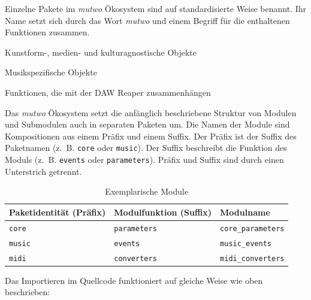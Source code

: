 \documentclass[12pt,a4paper,ngerman]{article}
\begin{document}
Einzelne Pakete im \emph{mutwo} Ökosystem sind auf standardisierte Weise benannt.
Ihr Name setzt sich durch das Wort \emph{mutwo} und einem Begriff für die enthaltenen Funktionen zusammen.

\bigskip

\hspace{0.5cm}
\begin{minipage}{0.95\textwidth}
    \begin{description}[style=multiline, leftmargin=3.25cm, font=\normalfont\emph]
        \item[mutwo.core] Kunstform-, medien- und kulturagnostische Objekte
        \item[mutwo.music] Musikspezifische Objekte
        \item[mutwo.reaper] Funktionen, die mit der DAW Reaper zusammenhängen
    \end{description}
\end{minipage}

\bigskip

Das \emph{mutwo} Ökosystem setzt die anfänglich beschriebene Struktur von Modulen und Submodulen auch in separaten Paketen um.
Die Namen der Module sind Kompositionen aus einem Präfix und einem Suffix.
Der Präfix ist der Suffix des Paketnamen (z.~B. \texttt{core} oder \texttt{music}).
Der Suffix beschreibt die Funktion des Moduls (z.~B. \texttt{events} oder \texttt{parameters}).
Präfix und Suffix sind durch einen Unterstrich getrennt.

\begin{table}[H]
    \begin{center}
        \begin{tabular}{l l l}
            \hline
            Paketidentität (Präfix) & Modulfunktion (Suffix) & Modulname \\ [0.5ex] 
            \hline\hline
            \texttt{core} & \texttt{parameters} & \texttt{core\_parameters} \\
            \texttt{music} & \texttt{events} & \texttt{music\_events} \\
            \texttt{midi} & \texttt{converters} & \texttt{midi\_converters} \\
            \hline
        \end{tabular}
    \end{center}

    \caption{Exemplarische Module}
\end{table}

Das Importieren im Quellcode funktioniert auf gleiche Weise wie oben beschrieben:
\end{document}
